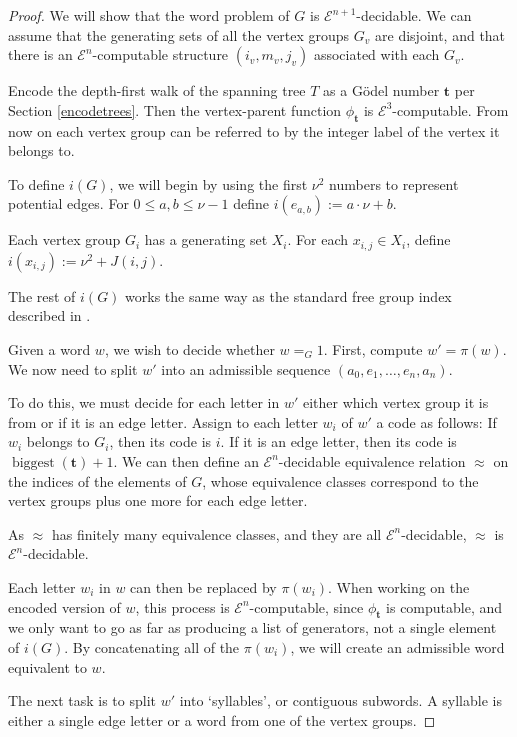 \documentclass[a4paper]{article}
\newcommand{\grz}[1]{$\mathcal{E}^{#1}$}	%
\newcommand{\tvec}{\mathbf{t}}	%
\theoremstyle{plain}
\theoremstyle{definition}
\begin{document}
\begin{proof}
	We will show that the word problem of $G$ is \grz{n+1}-decidable. We can assume that the generating sets of all the vertex groups $G_v$ are disjoint, and that there is an \grz{n}-computable structure $(i_v,m_v,j_v)$ associated with 
each $G_v$.

Encode the depth-first walk of the spanning tree $T$ as a G\"odel number $\tvec$ per Section \ref{encodetrees}. Then the vertex-parent function $\phi_{\tvec}$ is \grz{3}-computable. From now on each vertex group can be referred to by the integer label of the vertex it belongs to.

To define $i(G)$, we will begin by using the first $\nu^2$ numbers to represent potential edges. For $0 \leq a,b \leq \nu - 1$ define $i(e_{a,b}) := a \cdot \nu + b$.

Each vertex group $G_i$ has a generating set $X_i$. For each $x_{i,j} \in X_i$, define $i(x_{i,j}) := \nu^2 + J(i,j)$.

The rest of $i(G)$ works the same way as the standard free group index described in \cite[3.1]{Cannonito_1973}.	

Given a word $w$, we wish to decide whether $w =_G 1$. First, compute $w' = \pi(w)$. We now need to split $w'$ into an admissible sequence $(a_0,e_1,\dots,e_n,a_n)$.

To do this, we must decide for each letter in $w'$ either which vertex group it is from or if it is an edge letter. Assign to each letter $w_i$ of $w'$ a code as follows: If $w_i$ belongs to $G_i$, then its code is $i$. If it is an edge letter, then its code is $\operatorname{biggest}(\tvec)+1$. We can then define an \grz{n}-decidable equivalence relation $\approx$ on the indices of the elements of $G$, whose equivalence classes correspond to the vertex groups plus one more for each edge letter.

As $\approx$ has finitely many equivalence classes, and they are all \grz{n}-decidable, $\approx$ is \grz{n}-decidable.

Each letter $w_i$ in $w$ can then be replaced by $\pi(w_i)$. When working on the encoded version of $w$, this process is \grz{n}-computable, since $\phi_{\tvec}$ is computable, and we only want to go as far as producing a list of generators, not a single element of $i(G)$. By concatenating all of the $\pi(w_i)$, we will create an admissible word equivalent to $w$.

The next task is to split $w'$ into `syllables', or contiguous subwords. A syllable is either a single edge letter or a word from one of the vertex groups.


\end{proof}
\end{document}
